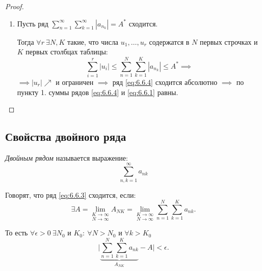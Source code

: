 \begin{proof}
\begin{enumerate}
        \item Пусть ряд $\sum_{n=1}^{\infty}\sum_{k=1}^{\infty}|a_{n_k}| = A^*$ сходится.

              Тогда $\forall r \ \exists N,K$ такие, что числа $u_1,\ldots,u_r$ содержатся в $N$ первых строчках и $K$ первых столбцах таблицы:
              \[
                  \sum_{i=1}^{r}|u_i| \leqslant \sum_{n=1}^{N}\sum_{k=1}^{K}|a_{n_k}| \leqslant A^* \implies
              \]
              $\implies |u_r|\nearrow$ и ограничен $\implies$ ряд \ref{eq:6.6.4} сходится абсолютно $\implies$ по пункту 1. суммы рядов \ref{eq:6.6.4} и \ref{eq:6.6.1} равны.
    \end{enumerate}
\end{proof}

\subsection{Свойства двойного ряда}

\begin{definition}
    \emph{Двойным рядом} называется выражение:
    \begin{equation}\label{eq:6.6.3}
        \sum_{n,k = 1}^{\infty} a_{nk}
    \end{equation}

    Говорят, что ряд \ref{eq:6.6.3} сходится, если:
    \[
        \exists A = \underset{N\rightarrow\infty}{\underset{K\rightarrow\infty}{\lim}}A_{NK} = \underset{N\rightarrow\infty}{\underset{K\rightarrow\infty}{\lim}}\sum_{n=1}^{N}\sum_{k=1}^{K}a_{nk}.
    \]

    То есть $\forall \epsilon > 0 \ \exists N_0$ и $K_0: \ \forall N > N_0$ и $\forall k > K_0$
    \[
        \bigg|\underbrace{\sum_{n=1}^{N}\sum_{k=1}^{K}a_{nk}}_{A_{NK}} - A\bigg| < \epsilon.
    \]
\end{definition}


